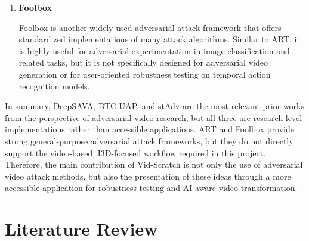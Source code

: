 \begin{enumerate}
    \item \textbf{Foolbox}
    
    \par Foolbox is another widely used adversarial attack framework that offers standardized implementations of many attack algorithms. Similar to ART, it is highly useful for adversarial experimentation in image classification and related tasks, but it is not specifically designed for adversarial video generation or for user-oriented robustness testing on temporal action recognition models.
\end{enumerate}

In summary, DeepSAVA, BTC-UAP, and stAdv are the most relevant prior works from the perspective of adversarial video research, but all three are research-level implementations rather than accessible applications. ART and Foolbox provide strong general-purpose adversarial attack frameworks, but they do not directly support the video-based, I3D-focused workflow required in this project. Therefore, the main contribution of Vid-Scratch is not only the use of adversarial video attack methods, but also the presentation of these ideas through a more accessible application for robustness testing and AI-aware video transformation.

\section{Literature Review}
\label{section:literature-review}

